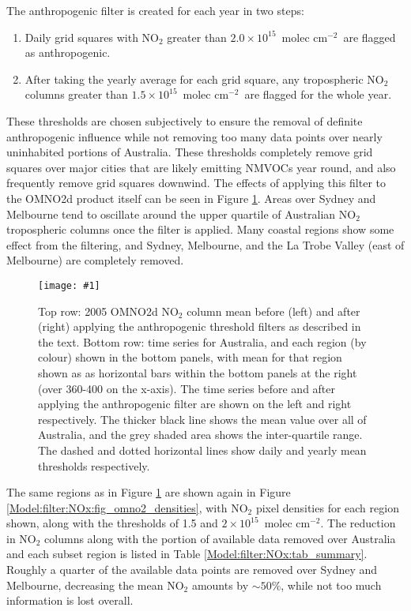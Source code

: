 \documentclass[acp, manuscript]{copernicus}
\newcommand{\moleccm}{~molec cm$^{-2}$}
\newcommand{\mypic}[3]{%
  \begin{figure}
    \texttt{[image: \#1]}
    \caption{#2}
    #3
  \end{figure}
}
\begin{document}
    The anthropogenic filter is created for each year in two steps:
    \begin{enumerate}
      \item Daily grid squares with NO$_2$ greater than $2.0 \times10^{15}$\moleccm  ~are flagged as anthropogenic.
      \item After taking the yearly average for each grid square, any tropospheric NO$_2$ columns greater than $1.5 \times 10^{15}$\moleccm ~are flagged for the whole year.
    \end{enumerate}
    These thresholds are chosen subjectively to ensure the removal of definite anthropogenic influence while not removing too many data points over nearly uninhabited portions of Australia.
    These thresholds completely remove grid squares over major cities that are likely emitting NMVOCs year round, and also frequently remove grid squares downwind.
    The effects of applying this filter to the OMNO2d product itself can be seen in Figure \ref{Model:filter:NOx:fig_omno2_threshaffect}.
    Areas over Sydney and Melbourne tend to oscillate around the upper quartile of Australian NO$_2$ tropospheric columns once the filter is applied.
    Many coastal regions show some effect from the filtering, and Sydney, Melbourne, and the La Trobe Valley (east of Melbourne) are completely removed.
    
    \mypic{Figures/OMNO2_thresheffect_2005_final.png}{%
      Top row: 2005 OMNO2d NO$_2$ column mean before (left) and after (right) applying the anthropogenic threshold filters as described in the text.
      Bottom row: time series for Australia, and each region (by colour) shown in the bottom panels, with mean for that region shown as as horizontal bars within the bottom panels at the right (over 360-400 on the x-axis).
      The time series before and after applying the anthropogenic filter are shown on the left and right respectively. 
      The thicker black line shows the mean value over all of Australia, and the grey shaded area shows the inter-quartile range.
      The dashed and dotted horizontal lines show daily and yearly mean thresholds respectively.
    }{\label{Model:filter:NOx:fig_omno2_threshaffect}}
    
    The same regions as in Figure \ref{Model:filter:NOx:fig_omno2_threshaffect} are shown again in Figure \ref{Model:filter:NOx:fig_omno2_densities}, with NO$_2$ pixel densities for each region shown, along with the thresholds of 1.5 and $2 \times 10^{15}$\moleccm.
    The reduction in NO$_2$ columns along with the portion of available data removed over Australia and each subset region is listed in Table \ref{Model:filter:NOx:tab_summary}.
    Roughly a quarter of the available data points are removed over Sydney and Melbourne, decreasing the mean NO$_2$ amounts by $\sim{50}\%$, while not too much information is lost overall.
    
\end{document}
